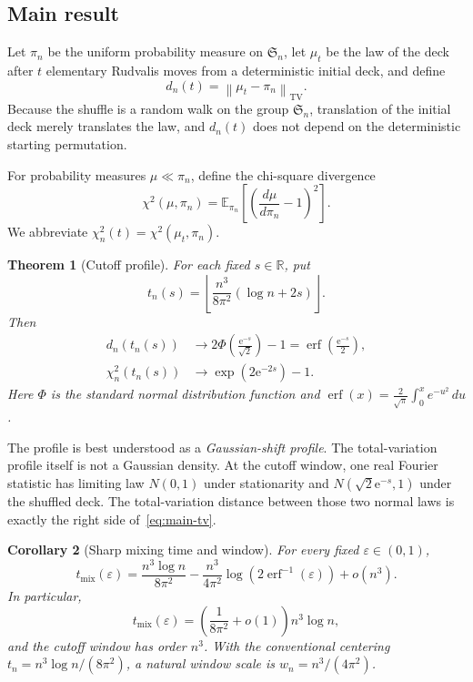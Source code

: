 \documentclass[11pt]{article}
\newtheorem{theorem}{Theorem}[section]
\newtheorem{corollary}[theorem]{Corollary}
\theoremstyle{remark}
\newcommand{\E}{\mathbb E}
\newcommand{\R}{\mathbb R}
\newcommand{\Sn}{\mathfrak S_n}
\newcommand{\TV}{\operatorname{TV}}
\newcommand{\erf}{\operatorname{erf}}
\newcommand{\norm}[1]{\left\lVert #1\right\rVert}
\newcommand{\floor}[1]{\left\lfloor #1\right\rfloor}
\newcommand{\ee}{\mathrm e}
\begin{document}
\subsection{Main result}
Let $\pi_n$ be the uniform probability measure on $\Sn$, let $\mu_t$ be the law of the deck after $t$ elementary Rudvalis moves from a deterministic initial deck, and define
\[
 d_n(t)=\norm{\mu_t-\pi_n}_{\TV}.
\]
Because the shuffle is a random walk on the group $\Sn$, translation of the initial deck merely translates the law, and $d_n(t)$ does not depend on the deterministic starting permutation.

For probability measures $\mu\ll\pi_n$, define the chi-square divergence
\[
 \chi^2(\mu,\pi_n)
 =\E_{\pi_n}\!\left[\left(\frac{d\mu}{d\pi_n}-1\right)^2\right].
\]
We abbreviate $\chi_n^2(t)=\chi^2(\mu_t,\pi_n)$.

\begin{theorem}[Cutoff profile]\label{thm:mainprofile}
For each fixed $s\in\R$, put
\[
 t_n(s)=\floor{\frac{n^3}{8\pi^2}(\log n+2s)}.
\]
Then
\begin{align}
 d_n(t_n(s))&\longrightarrow
  2\Phi\!\left(\frac{\ee^{-s}}{\sqrt2}\right)-1
  =\erf\!\left(\frac{\ee^{-s}}2\right),\label{eq:main-tv}\\
 \chi_n^2(t_n(s))&\longrightarrow
  \exp(2\ee^{-2s})-1.\label{eq:main-chi}
\end{align}
Here $\Phi$ is the standard normal distribution function and
$\erf(x)=\frac2{\sqrt\pi}\int_0^x e^{-u^2}\,du$.
\end{theorem}

The profile is best understood as a \emph{Gaussian-shift profile}.  The total-variation profile itself is not a Gaussian density.  At the cutoff window, one real Fourier statistic has limiting law $N(0,1)$ under stationarity and $N(\sqrt2\ee^{-s},1)$ under the shuffled deck.  The total-variation distance between those two normal laws is exactly the right side of~\eqref{eq:main-tv}.

\begin{corollary}[Sharp mixing time and window]\label{cor:mixing}
For every fixed $\varepsilon\in(0,1)$,
\[
 t_{\mathrm{mix}}(\varepsilon)
 =\frac{n^3\log n}{8\pi^2}
 -\frac{n^3}{4\pi^2}
   \log\!\left(2\erf^{-1}(\varepsilon)\right)
 +o(n^3).
\]
In particular,
\[
 t_{\mathrm{mix}}(\varepsilon)
 =\left(\frac1{8\pi^2}+o(1)\right)n^3\log n,
\]
and the cutoff window has order $n^3$.  With the conventional centering
$t_n=n^3\log n/(8\pi^2)$, a natural window scale is
$w_n=n^3/(4\pi^2)$.
\end{corollary}
\end{document}
